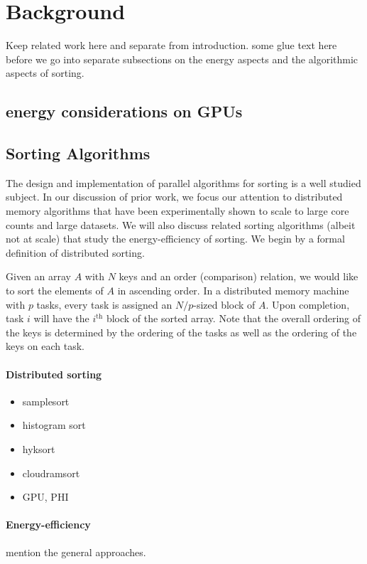 \section{Background}
Keep related work here and separate from introduction. some glue text here before we go into separate subsections on the energy aspects and the algorithmic aspects of sorting.

\subsection{energy considerations on GPUs}

\subsection{Sorting Algorithms}
The design and implementation of parallel algorithms for sorting is a well studied subject. In our discussion of prior work, we focus our attention to distributed memory algorithms that have been experimentally shown to scale to large core counts and large datasets. We will also discuss related sorting algorithms (albeit not at scale) that study the energy-efficiency of sorting. We begin by a formal definition of distributed sorting.

Given an array $A$ with $N$ keys and an order (comparison) relation, we would like to sort the elements of $A$ in ascending order. In a distributed memory machine with $p$ tasks, every task is assigned an $N/p$-sized block of $A$. Upon completion, task $i$ will have the $i^{\text{th}}$ block of the sorted array. Note that the overall ordering of the keys is determined by the ordering of the tasks as well as the ordering of the keys on each task.  

\paragraph{Distributed sorting}

\begin{itemize}
  \item samplesort
  \item histogram sort
  \item hyksort
  \item cloudramsort
  \item GPU, PHI
\end{itemize}

\paragraph{Energy-efficiency}
mention the general approaches. 
